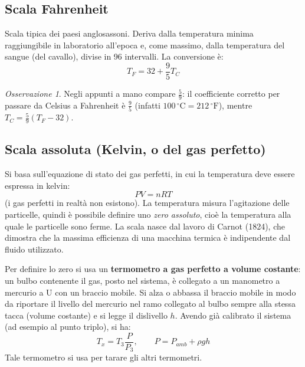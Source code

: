 \documentclass[11pt, a4paper, openright]{book}
\theoremstyle{plain}
\theoremstyle{definition}
\theoremstyle{remark}
\newtheorem{osservazione}[teorema]{Osservazione}
\begin{document}
\subsection{Scala Fahrenheit}
Scala tipica dei paesi anglosassoni. Deriva dalla temperatura minima raggiungibile in laboratorio all'epoca e, come massimo, dalla temperatura del sangue (del cavallo), divise in 96 intervalli. La conversione è:
\begin{equation}
    T_F = 32 + \frac{9}{5} T_C
\end{equation}
\begin{osservazione}
    Negli appunti a mano compare $\frac{5}{9}$: il coefficiente corretto per passare da Celsius a Fahrenheit è $\frac{9}{5}$ (infatti $100\,^\circ\text{C} = 212\,^\circ\text{F}$), mentre $T_C = \frac{5}{9}(T_F - 32)$.
\end{osservazione}

\subsection{Scala assoluta (Kelvin, o del gas perfetto)}
Si basa sull'equazione di stato dei gas perfetti, in cui la temperatura deve essere espressa in kelvin:
\begin{equation}
    PV = nRT
\end{equation}
(i gas perfetti in realtà non esistono). La temperatura misura l'agitazione delle particelle, quindi è possibile definire uno \emph{zero assoluto}, cioè la temperatura alla quale le particelle sono ferme. La scala nasce dal lavoro di Carnot (1824), che dimostra che la massima efficienza di una macchina termica è indipendente dal fluido utilizzato.

Per definire lo zero si usa un \textbf{termometro a gas perfetto a volume costante}: un bulbo contenente il gas, posto nel sistema, è collegato a un manometro a mercurio a U con un braccio mobile. Si alza o abbassa il braccio mobile in modo da riportare il livello del mercurio nel ramo collegato al bulbo sempre alla stessa tacca (volume costante) e si legge il dislivello $h$. Avendo già calibrato il sistema (ad esempio al punto triplo), si ha:
\begin{equation}
    T_x = T_3\frac{P}{P_3}, \qquad P = P_{amb} + \rho g h
\end{equation}
Tale termometro si usa per tarare gli altri termometri.
\end{document}
